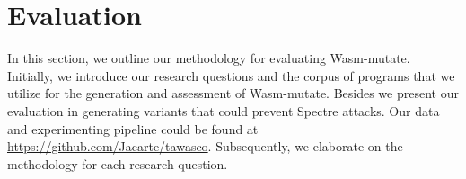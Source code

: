 \documentclass[sigplan,screen]{acmart}
\newcommand*\badge[1]{ \colorbox{red}{\color{white}#1}}
\newcommand{\tool}{Wasm-mutate\xspace}
\newcommand{\Wasm}{WebAssembly\xspace}
\newcommand{\dataurl}{\url{https://github.com/Jacarte/tawasco}}
\newcommand{\todo}[1]{%
\refstepcounter{todo}
\noindent\textbf{\badge{TODO}} {\color{red}#1}
\addcontentsline{td}{todo}
{\color{red}\thesection.\thetodo\xspace #1}}
\begin{document}
%




\vspace{-2mm}
\section {Evaluation}
\label{eval}

In this section, we outline our methodology for evaluating \tool.
Initially, we introduce our research questions and the corpus of programs that we utilize for the generation and assessment of \tool.
Besides we present our evaluation in  generating variants that could prevent Spectre attacks.
Our data and experimenting pipeline could be found at \dataurl.
Subsequently, we elaborate on the methodology for each research question.


\newcommand\rqstatic{To what extent are the program variants generated by \tool statically different at the WebAssembly and Machine Code levels?\xspace}

\newcommand\rqdynamic{ To what extent are the program variants generated by \tool dynamically different?\xspace}

\newcommand\rqdefensive{To what extent does \tool prevent Spectre side-channel attacks on \Wasm programs?\xspace}


\newcommand\rqperformance{To what extent does \tool affects \Wasm variants performance?\xspace}

\newcommand\rqofensive{To what extent are the program variants generated by \tool harmful?\xspace}


\newcommand\rqtesting{To what extent can \tool be used to perform differential testing of \Wasm tools?\xspace}
\end{document}
